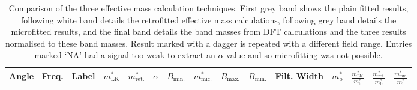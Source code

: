 \begin{table}
    \begin{center}
        \caption{Comparison of the three effective mass calculation techniques. First grey band shows the plain \LK fitted results, following white band details the retrofitted effective mass calculations, following grey band details the microfitted results, and the final band details the band masses from DFT calculations and the three results normalised to these band masses. Result marked with a dagger is repeated with a different field range. Entries marked `NA' had a signal too weak to extract an $\alpha$ value and so microfitting was not possible.}
{\small
        \begin{tabular}[htbp]{rrlrrrrrrrrrrrr}
\toprule
Angle	& Freq.	& Label	& $m^*_{\textrm{LK}}$	& $m^*_{\textrm{ret.}}$	& $\alpha$	& $B_{\textrm{min.}}$	& $m^*_{\textrm{mic.}}$	& $B_{\textrm{max.}}$	& $B_{\textrm{min.}}$	& Filt. Width	& $m^*_{\textrm{b}}$	& $\frac{m^*_{\textrm{LK}}}{m^*_{\textrm{b}}}$	& $\frac{m^*_{\textrm{ret.}}}{m^*_{\textrm{b}}}$	& $\frac{m^*_{\textrm{mic.}}}{m^*_{\textrm{b}}}$ \\
\midrule

\bottomrule
        \end{tabular}
}
        \label{Tab:ResD:EffectiveMassResults}
    \end{center}
\end{table}
